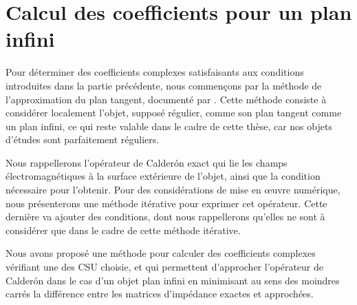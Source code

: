 \chapter{Calcul des coefficients pour un plan infini}
\label{sec:plan}
\minitoc
\newpage

Pour déterminer des coefficients complexes satisfaisants aux conditions introduites dans la partie précédente, nous commençons par la méthode de l'approximation du plan tangent, documenté par \cite{hoppe_impedance_1995,marceaux_high-order_2000,aubakirov_electromagnetic_2014}.
Cette méthode consiste à considérer localement l'objet, supposé régulier, comme son plan tangent comme un plan infini, ce qui reste valable dans le cadre de cette thèse, car nos objets d'études sont parfaitement réguliers.

Nous rappellerons l'opérateur de Calderón exact qui lie les champs électromagnétiques à la surface extérieure de l’objet, ainsi que la condition nécessaire pour l'obtenir.
Pour des considérations de mise en œuvre numérique, nous présenterons une méthode itérative pour exprimer cet opérateur.
Cette dernière va ajouter des conditions, dont nous rappellerons qu'elles ne sont à considérer que dans le cadre de cette méthode itérative.








Nous avons proposé une méthode pour calculer des coefficients complexes vérifiant une des CSU choisie, et qui permettent d'approcher l'opérateur de Calderón dans le cas d'un objet plan infini en minimisant au sens des moindres carrés la différence entre les matrices d'impédance exactes et approchées.

